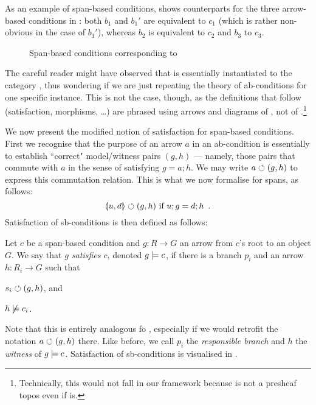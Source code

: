 As an example of span-based conditions,  shows counterparts for the three arrow-based conditions in : both $b_1$ and $b_1'$ are equivalent to $c_1$ (which is rather non-obvious in the case of $b_1'$), whereas $b_2$ is equivalent to $c_2$ and $b_3$ to $c_3$.

\begin{figure}[t]
\centering

\caption{Span-based conditions corresponding to }
\end{figure}

\medskip\noindent The careful reader might have observed that  is essentially  instantiated to the category {\SpanC}, thus wondering if we are just repeating the theory of ab-conditions for one specific instance. This is not the case, though, as the definitions that follow (satisfaction, morphisms, \ldots) are phrased using arrows and diagrams of , not of {\SpanC}.\footnote{Technically, this would not fall in our framework because {\SpanC} is not a presheaf topos even if  is.}

We now present the modified notion of satisfaction for span-based conditions. First we recognise that the purpose of an arrow $a$ in an ab-condition is essentially to establish ``correct" model/witness pairs $(g,h)$ --- namely, those pairs that commute with $a$ in the sense of satisfying $g=a;h$. We may write $a\circlearrowleft (g,h)$ to express this commutation relation. This is what we now formalise for spans, as follows:
\[ \spanof u d \commutes (g,h) \text{ if } u;g=d;h \enspace. \]
Satisfaction of sb-conditions is then defined as follows:

\begin{definition}
  Let $c$ be a span-based condition and $g:R\to G$ an arrow from $c$'s root to an object $G$. We say that \emph{$g$ satisfies $c$}, denoted $g\models c$, if there is a branch $p_i$ and an arrow $h:R_i\to G$ such that
  \begin{enumerate*}
  \item $s_i \circlearrowleft (g, h)$, and
  \item $h\not\models c_i$.
  \end{enumerate*}
\end{definition}
%
Note that this is entirely analogous fo , especially if we would retrofit the notation $a\circlearrowleft (g,h)$ there. Like before, we call $p_i$ the \emph{responsible branch} and $h$ the \emph{witness} of $g\models c$. Satisfaction of sb-conditions is visualised in .

